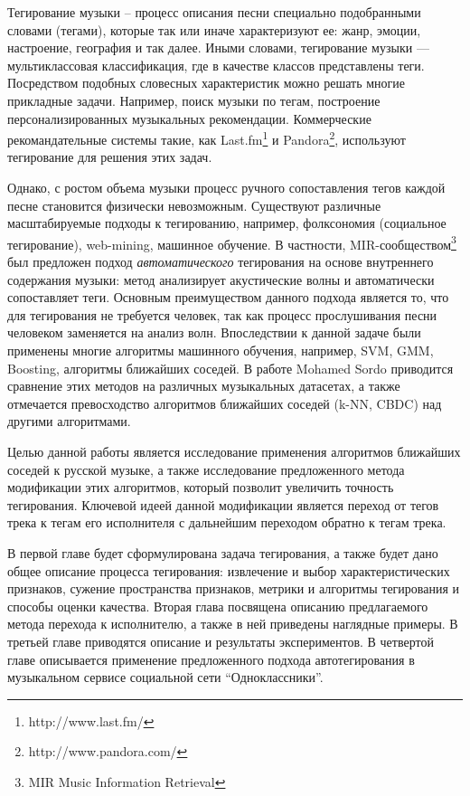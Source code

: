 \startprefacepage	

Тегирование музыки -- процесс описания песни специально подобранными словами (тегами), которые так или иначе характеризуют ее: жанр, эмоции, настроение, география и так далее.
Иными словами, тегирование музыки {{---}} мультиклассовая классификация, где в качестве классов представлены теги.
Посредством подобных словесных характеристик можно решать многие прикладные задачи. Например, поиск музыки по тегам, построение персонализированных музыкальных рекомендации.
Коммерческие рекомандательные системы такие, как Last.fm\footnote{http://www.last.fm/} и Pandora\footnote{http://www.pandora.com/}, используют тегирование для решения этих задач. 

Однако, с ростом объема музыки процесс ручного сопоставления 
тегов каждой песне становится физически невозможным. Существуют различные масштабируемые подходы к тегированию, например, фолксономия (социальное тегирование), web-mining, машинное обучение. 
В частности, MIR-сообществом\footnote{MIR \ld Music Information Retrieval} был предложен подход \emph{автоматического} тегирования на основе внутреннего содержания музыки: 
метод анализирует акустические волны и автоматически сопоставляет теги. 
Основным преимуществом данного подхода является то, что для тегирования не требуется человек, так как процесс прослушивания песни человеком заменяется на анализ волн.
Впоследствии к данной задаче были применены многие алгоритмы машинного обучения, например, SVM, GMM, Boosting, алгоритмы ближайших соседей. 
В работе Mohamed Sordo приводится сравнение этих методов на различных музыкальных датасетах, а также отмечается превосходство алгоритмов ближайших соседей (k-NN, CBDC) над другими алгоритмами.

Целью данной работы является исследование применения алгоритмов ближайших соседей к русской музыке, а также исследование предложенного метода модификации этих алгоритмов, который
позволит увеличить точность тегирования.
Ключевой идеей данной модификации является переход от тегов трека к тегам его исполнителя с дальнейшим переходом обратно к тегам трека.

В первой главе будет сформулирована задача тегирования, а также будет дано общее описание процесса тегирования: извлечение и выбор характеристических признаков,
сужение пространства признаков, метрики и алгоритмы тегирования и способы оценки качества.
Вторая глава посвящена описанию предлагаемого метода перехода к исполнителю, а также в ней приведены наглядные примеры.
В третьей главе приводятся описание и результаты экспериментов. В четвертой главе описывается применение предложенного подхода автотегирования в музыкальном сервисе
социальной сети ``Одноклассники''.